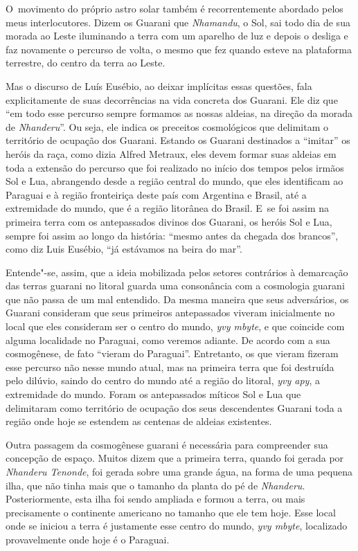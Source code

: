 O~movimento do próprio astro solar também é recorrentemente abordado
pelos meus interlocutores. Dizem os Guarani que \emph{Nhamandu}, o Sol, sai
todo dia de sua morada ao Leste iluminando a terra com um aparelho de
luz e depois o desliga e faz novamente o percurso de volta, o mesmo que
fez quando esteve na plataforma terrestre, do centro da terra ao Leste.

Mas o discurso de Luís Eusébio, ao deixar implícitas essas questões,
fala explicitamente de suas decorrências na vida concreta dos Guarani.
Ele diz que ``em todo esse percurso sempre formamos as nossas aldeias,
na direção da morada de \emph{Nhanderu}''. Ou seja, ele indica os preceitos
cosmológicos que delimitam o território de ocupação dos Guarani.
Estando os Guarani destinados a ``imitar'' os heróis da raça, como dizia
Alfred Metraux, eles devem formar suas aldeias em toda a extensão do
percurso que foi realizado no início dos tempos pelos irmãos Sol e Lua,
abrangendo desde a região central do mundo, que eles identificam ao
Paraguai e à região fronteiriça deste país com Argentina e Brasil, até
a extremidade do mundo, que é a região litorânea do Brasil. E~se foi
assim na primeira terra com os antepassados divinos dos Guarani, os
heróis Sol e Lua, sempre foi assim ao longo da história: ``mesmo antes
da chegada dos brancos'', como diz Luis Eusébio, ``já estávamos na beira
do mar''.

Entende"-se, assim, que a ideia mobilizada pelos setores contrários à
demarcação das terras guarani no litoral guarda uma consonância com a
cosmologia guarani que não passa de um mal entendido. Da mesma maneira
que seus adversários, os Guarani consideram que seus primeiros
antepassados viveram inicialmente no local que eles consideram ser o
centro do mundo, \emph{yvy mbyte}, e que coincide com alguma localidade no
Paraguai, como veremos adiante. De acordo com a sua cosmogênese, de
fato ``vieram do Paraguai''. Entretanto, os que vieram fizeram esse
percurso não nesse mundo atual, mas na primeira terra que foi destruída
pelo dilúvio, saindo do centro do mundo até a região do litoral, \emph{yvy
apy}, a extremidade do mundo. Foram os antepassados míticos Sol e Lua
que delimitaram como território de ocupação dos seus descendentes
Guarani toda a região onde hoje se estendem as centenas de aldeias
existentes.

Outra passagem da cosmogênese guarani é necessária para compreender sua
concepção de espaço. Muitos dizem que a primeira terra, quando foi
gerada por \emph{Nhanderu Tenonde}, foi gerada sobre uma grande água, na forma
de uma pequena ilha, que não tinha mais que o tamanho da planta do pé
de \emph{Nhanderu}. Posteriormente, esta ilha foi sendo ampliada e formou a
terra, ou mais precisamente o continente americano no tamanho que ele
tem hoje. Esse local onde se iniciou a terra é justamente esse centro
do mundo, \emph{yvy mbyte}, localizado provavelmente onde hoje é o Paraguai.

